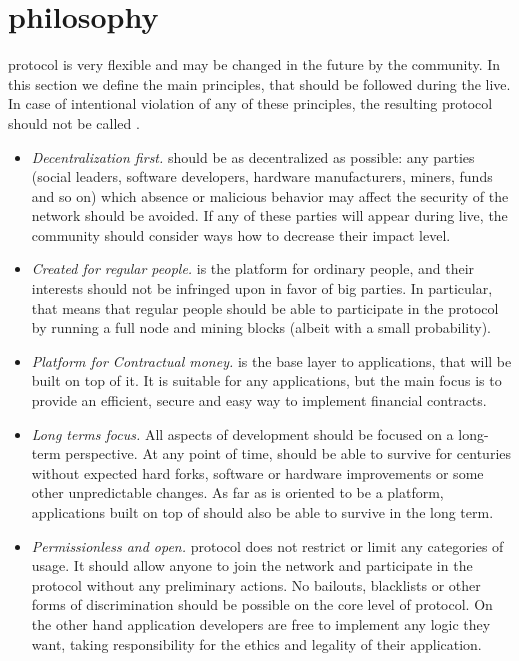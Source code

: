 \section{\Ergo{} philosophy}
\label{sec:social}


\Ergo{} protocol is very flexible and may be changed in the future by the community.
In this section we define the main principles, that should be followed during the \Ergo{} live.
In case of intentional violation of any of these principles, the resulting protocol should not
be called \Ergo{}.

\begin{itemize}
    \item{\em Decentralization first.} \Ergo{} should be as decentralized as possible: any parties (social leaders, software developers, hardware manufacturers, miners, funds and so on)
    which absence or malicious behavior may affect the security of the network should be avoided.
    If any of these parties will appear during \Ergo{} live, the community should consider ways how to decrease their impact level.
    \item{\em Created for regular people.} \Ergo{} is the platform for ordinary people, and their interests should not be infringed upon in favor of big parties.
    In particular, that means that regular people should be able to participate in the protocol by running a full node and mining blocks (albeit with a small probability).
    \item{\em Platform for Contractual money.} \Ergo{} is the base layer to applications, that will be built on top of it.
    It is suitable for any applications, but the main focus is to provide an efficient, secure and easy way to implement financial contracts.
    \item{\em Long terms focus.} All aspects of \Ergo{} development should be focused on a long-term perspective.
    At any point of time, \Ergo{} should be able to survive for centuries without expected hard forks,
    software or hardware improvements or some other unpredictable changes. As far as \Ergo{} is oriented to be a platform, applications built on top of \Ergo{} should also be able to survive in the long term.
    \item{\em Permissionless and open.} \Ergo{} protocol does not restrict or limit any categories of usage.
    It should allow anyone to join the network and participate in the protocol without any preliminary actions.
    No bailouts, blacklists or other forms of discrimination should be possible on the core level of \Ergo{} protocol.
    On the other hand application developers are free to implement any logic they want, taking responsibility for the ethics and legality of their application.
\end{itemize}